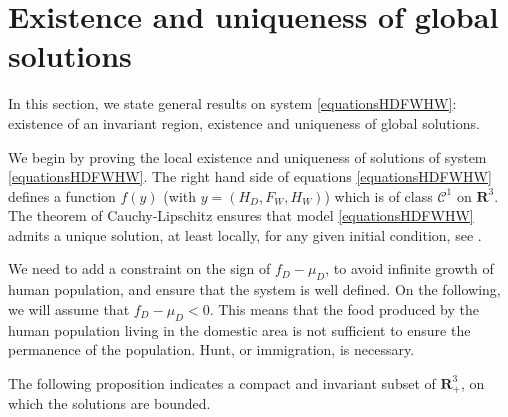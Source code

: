 \documentclass{article}
\begin{document}
\section{Existence and uniqueness of global solutions}
In this section, we state general results on system \eqref{equationsHDFWHW}:  existence of an invariant region, existence and uniqueness of global solutions.

We begin by proving the local existence and uniqueness of solutions of system \eqref{equationsHDFWHW}. The right hand side of equations \eqref{equationsHDFWHW} defines a function $f(y)$ (with $y = (H_D, F_W, H_W)$) which is of class $\mathcal{C}^1$ on $\mathbf{R}^3$. The theorem of Cauchy-Lipschitz ensures that model \eqref{equationsHDFWHW} admits a unique solution, at least locally, for any given initial condition, see \cite{walter_ordinary_1998}.

We need to add a constraint on the sign of $f_D - \mu_D$, to avoid infinite growth of human population, and ensure that the system is well defined. On the following, we will assume that $f_D - \mu_D < 0$. This means that the food produced by the human population living in the domestic area is not sufficient to ensure the permanence of the population. Hunt, or immigration, is necessary. 

The following proposition indicates a compact and invariant subset of $\mathbf{R}_+^3$, on which the solutions are bounded.
\end{document}
